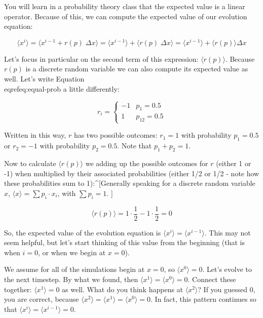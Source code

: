 \documentclass[
]{book}
\theoremstyle{definition}
\theoremstyle{definition}
\theoremstyle{definition}
\theoremstyle{remark}
\begin{document}
You will learn in a probability theory class that the expected value is a linear operator.  Because of this, we can compute the expected value of our evolution equation:

\begin{equation}
\big \langle x^{i} \big \rangle = \big \langle x^{i-1}+r(p) \;\Delta x \big \rangle = \big \langle x^{i-1} \big \rangle + \big \langle r(p) \;  \Delta x \big \rangle = \big \langle x^{i-1} \big \rangle + \big \langle r(p)  \big \rangle  \Delta x
\end{equation}

Let's focus in particular on the second term of this expression: $\big \langle r(p) \big \rangle$.  Because $r(p)$ is a discrete random variable we can also compute its expected value as well.  Let's write Equation \\eqref{eq:equal-prob} a little differently:

\begin{equation}
r_{i}=\begin{cases} -1 & p_{1}=0.5 \\ \label{eq:equal-prob}
1 & p_{12} =0.5 \end{cases}
\end{equation}

Written in this way, $r$ has two possible outcomes: $r_{1} = 1$ with probability $p_{1}=0.5$ or $r_{2}=-1$ with probability $p_{2}=0.5$.  Note that $p_{1}+p_{2}=1$.


Now to calculate $\langle r(p) \rangle$ we adding up the possible outcomes for $r$ (either 1 or -1) when multiplied by their associated probabilities (either 1/2 or 1/2 - note how these probabilities sum to 1):^[Generally speaking for a discrete random variable $x$, $\displaystyle \langle x \rangle = \sum p_{i} \cdot x_{i}$, with $\displaystyle \sum p_{i}=1$. ]

\begin{equation}
\big \langle r(p) \big \rangle = 1 \cdot \frac{1}{2} - 1 \cdot \frac{1}{2} = 0
\end{equation}

So, the expected value of the evolution equation is $\big \langle x^{i} \big \rangle = \big \langle x^{i-1} \big \rangle$. This may not seem helpful, but let's start thinking of this value from the beginning (that is when $i=0$, or when we begin at $x=0$).

We assume for all of the simulations begin at $x=0$, so $\big \langle x^{0} \big \rangle = 0$.  Let's evolve to the next timestep.  By what we found, then $\big \langle x^{1} \big \rangle = \big \langle x^{0} \big \rangle =0$.  Connect these together: $\big \langle x^{1} \big \rangle = 0$ as well. What do you think happens at $\big \langle x^{2} \big \rangle$? If you guessed 0, you are correct, because $\big \langle x^{2} \big \rangle = \big \langle x^{1} \big \rangle = \big \langle x^{0} \big \rangle = 0$.  In fact, this pattern continues so that $\big \langle x^{i} \big \rangle = \big \langle x^{i-1} \big \rangle=0$. 
\end{document}

